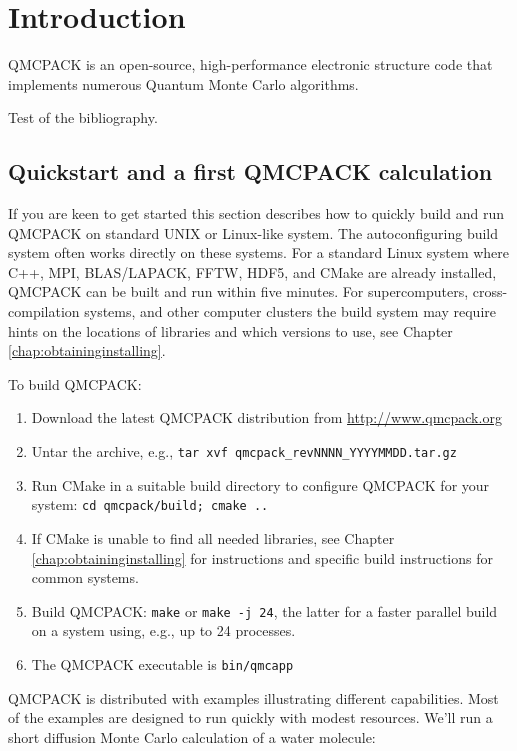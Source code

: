 \chapter{Introduction}
\label{chap:introduction}

QMCPACK is an open-source, high-performance electronic structure code that implements numerous Quantum Monte Carlo algorithms.

Test of the bibliography\cite{CeperleyAlderPRL1980}.

\section{Quickstart and a first QMCPACK calculation}
If you are keen to get started this section describes how to quickly
build and run QMCPACK on standard UNIX or Linux-like system. The
autoconfiguring build system often works directly on these
systems. For a standard
Linux system where C++, MPI, BLAS/LAPACK, FFTW, HDF5, and CMake are already installed,
QMCPACK can be built and run within five minutes. For supercomputers, cross-compilation systems, and other computer
clusters the build system may require hints on the locations of
libraries and which versions to use,  see Chapter
\ref{chap:obtaininginstalling}.

To build QMCPACK:

\begin{enumerate}
\item Download the latest QMCPACK distribution from
  \url{http://www.qmcpack.org}
\item Untar the archive, e.g., \texttt{tar xvf
    qmcpack\_revNNNN\_YYYYMMDD.tar.gz}
\item Run CMake in a suitable build directory to configure QMCPACK for
  your system: \texttt{cd
    qmcpack/build; cmake ..}
\item If CMake is unable to find all needed libraries, see Chapter
  \ref{chap:obtaininginstalling} for instructions and specific build
  instructions for common systems.
\item Build QMCPACK: \texttt{make} or \texttt{make -j 24}, the latter
  for a faster parallel build on a system using, e.g., up to 24 processes.
\item The QMCPACK executable is \texttt{bin/qmcapp}
\end{enumerate}

QMCPACK is distributed with examples illustrating different
capabilities. Most of the examples are designed to run quickly with
modest resources. We'll run a short diffusion Monte Carlo calculation
of a water molecule:

